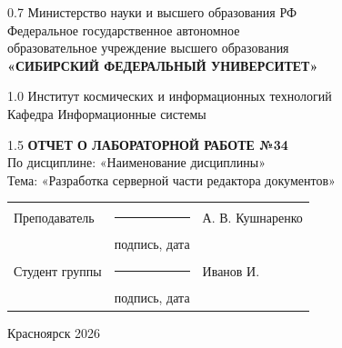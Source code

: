 \begin{titlepage}
	\begin{center}
		\begin{spacing}{0.7}
		Министерство науки и высшего образования РФ\\
		{\small Федеральное государственное автономное}\\
		{\small образовательное учреждение высшего образования}\\
		\textbf{\small«СИБИРСКИЙ ФЕДЕРАЛЬНЫЙ УНИВЕРСИТЕТ»}\\
		\end{spacing}
		
		\vfill
		
		\begin{spacing}{1.0}
		Институт космических и информационных технологий\\
		Кафедра Информационные системы\\
		\end{spacing}
		
		\vfill
		\vfill
		
		\begin{spacing}{1.5}
			\textbf{\large ОТЧЕТ О ЛАБОРАТОРНОЙ РАБОТЕ №34}\\[5mm]
			По дисциплине: «Наименование дисциплины»\\[3mm]
			Тема: «Разработка серверной части редактора документов»
		\end{spacing}
    \end{center}		

	\vfill
	\vfill
	
\noindent
\begin{tabular}{@{} p{} p{} p{} @{}}
	Преподаватель    & \rule{3.5cm}{.1pt} & А. В. Кушнаренко \\
	                 & {\scriptsize подпись, дата} & \\ [4ex]
	Студент группы   & \rule{3.5cm}{.1pt} & Иванов И. \\
	 & {\scriptsize подпись, дата} & \\
\end{tabular}

\vfill
\begin{center}Красноярск 2026\end{center}
\end{titlepage}
\restoregeometry